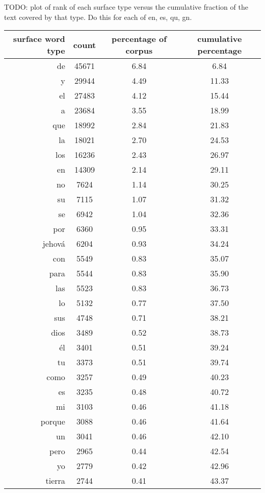 \begin{figure*}
TODO: plot of rank of each surface type versus the cumulative fraction of the text
covered by that type. Do this for each of en, es, qu, gn.



\begin{tiny}
\begin{centering}
\begin{tabular}{|r|c|c|c|}
\hline
surface word type & count & percentage of corpus & cumulative percentage \\
\hline
de & 45671 & 6.84 & 6.84 \\
y & 29944 & 4.49 & 11.33 \\
el & 27483 & 4.12 & 15.44 \\
a & 23684 & 3.55 & 18.99 \\
que & 18992 & 2.84 & 21.83 \\
la & 18021 & 2.70 & 24.53 \\
los & 16236 & 2.43 & 26.97 \\
en & 14309 & 2.14 & 29.11 \\
no & 7624 & 1.14 & 30.25 \\
su & 7115 & 1.07 & 31.32 \\
se & 6942 & 1.04 & 32.36 \\
por & 6360 & 0.95 & 33.31 \\
jehová & 6204 & 0.93 & 34.24 \\
con & 5549 & 0.83 & 35.07 \\
para & 5544 & 0.83 & 35.90 \\
las & 5523 & 0.83 & 36.73 \\
lo & 5132 & 0.77 & 37.50 \\
sus & 4748 & 0.71 & 38.21 \\
dios & 3489 & 0.52 & 38.73 \\
él & 3401 & 0.51 & 39.24 \\
tu & 3373 & 0.51 & 39.74 \\
como & 3257 & 0.49 & 40.23 \\
es & 3235 & 0.48 & 40.72 \\
mi & 3103 & 0.46 & 41.18 \\
porque & 3088 & 0.46 & 41.64 \\
un & 3041 & 0.46 & 42.10 \\
pero & 2965 & 0.44 & 42.54 \\
yo & 2779 & 0.42 & 42.96 \\
tierra & 2744 & 0.41 & 43.37 \\

\end{tabular}
\end{centering}
\end{tiny}
\end{figure*}
